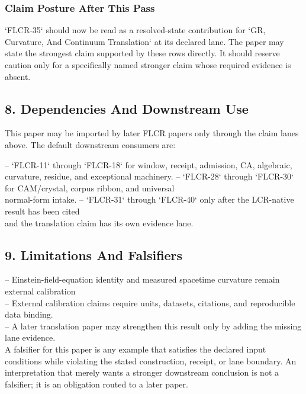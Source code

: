 \documentclass[11pt]{article}
\begin{document}
\subsubsection*{Claim Posture After This Pass}

`FLCR-35` should now be read as a resolved-state contribution for `GR, Curvature, And Continuum Translation` at its declared lane. The paper may state the strongest claim supported by these rows directly. It should reserve caution only for a specifically named stronger claim whose required evidence is absent.

\subsection*{8. Dependencies And Downstream Use}

This paper may be imported by later FLCR papers only through the claim lanes
above. The default downstream consumers are:

\noindent{}-- `FLCR-11` through `FLCR-18` for window, receipt, admission, CA, algebraic,\\
  curvature, residue, and exceptional machinery.
\noindent{}-- `FLCR-28` through `FLCR-30` for CAM/crystal, corpus ribbon, and universal\\
  normal-form intake.
\noindent{}-- `FLCR-31` through `FLCR-40` only after the LCR-native result has been cited\\
  and the translation claim has its own evidence lane.

\subsection*{9. Limitations And Falsifiers}

\noindent{}-- Einstein-field-equation identity and measured spacetime curvature remain external calibration\\
\noindent{}-- External calibration claims require units, datasets, citations, and reproducible data binding.\\
\noindent{}-- A later translation paper may strengthen this result only by adding the missing lane evidence.\\

A falsifier for this paper is any example that satisfies the declared input
conditions while violating the stated construction, receipt, or lane boundary.
An interpretation that merely wants a stronger downstream conclusion is not a
falsifier; it is an obligation routed to a later paper.
\end{document}
